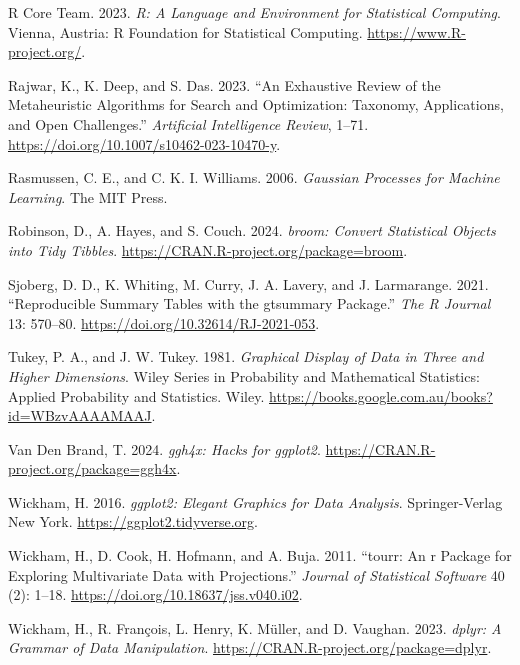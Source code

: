 \documentclass[
  12pt,
]{interact}
\newlength{\cslhangindent}
\newenvironment{CSLReferences}[2] %
 {\begin{list}{}{%
  \setlength{\itemindent}{0pt}
  \setlength{\leftmargin}{0pt}
  \setlength{\parsep}{0pt}
  \ifodd #1
   \setlength{\leftmargin}{\cslhangindent}
   \setlength{\itemindent}{-1\cslhangindent}
  \fi
  \setlength{\itemsep}{#2\baselineskip}}}
 {\end{list}}
\theoremstyle{plain}
\begin{document}
\begin{CSLReferences}{1}{0}
R Core Team. 2023. \emph{R: A Language and Environment for Statistical
Computing}. Vienna, Austria: R Foundation for Statistical Computing.
\url{https://www.R-project.org/}.

Rajwar, K., K. Deep, and S. Das. 2023. {``An Exhaustive Review of the
Metaheuristic Algorithms for Search and Optimization: Taxonomy,
Applications, and Open Challenges.''} \emph{Artificial Intelligence
Review}, 1--71. \url{https://doi.org/10.1007/s10462-023-10470-y}.

Rasmussen, C. E., and C. K. I. Williams. 2006. \emph{Gaussian Processes
for Machine Learning}. The MIT Press.

Robinson, D., A. Hayes, and S. Couch. 2024. \emph{{b}room: Convert
Statistical Objects into Tidy Tibbles}.
\url{https://CRAN.R-project.org/package=broom}.

Sjoberg, D. D., K. Whiting, M. Curry, J. A. Lavery, and J. Larmarange.
2021. {``Reproducible Summary Tables with the {g}tsummary Package.''}
\emph{{The R Journal}} 13: 570--80.
\url{https://doi.org/10.32614/RJ-2021-053}.

Tukey, P. A., and J. W. Tukey. 1981. \emph{Graphical Display of Data in
Three and Higher Dimensions}. Wiley Series in Probability and
Mathematical Statistics: Applied Probability and Statistics. Wiley.
\url{https://books.google.com.au/books?id=WBzvAAAAMAAJ}.

Van Den Brand, T. 2024. \emph{{g}gh4x: Hacks for {ggplot2}}.
\url{https://CRAN.R-project.org/package=ggh4x}.

Wickham, H. 2016. \emph{{g}gplot2: Elegant Graphics for Data Analysis}.
Springer-Verlag New York. \url{https://ggplot2.tidyverse.org}.

Wickham, H., D. Cook, H. Hofmann, and A. Buja. 2011. {``{t}ourr: An r
Package for Exploring Multivariate Data with Projections.''}
\emph{Journal of Statistical Software} 40 (2): 1--18.
\url{https://doi.org/10.18637/jss.v040.i02}.

Wickham, H., R. François, L. Henry, K. Müller, and D. Vaughan. 2023.
\emph{{d}plyr: A Grammar of Data Manipulation}.
\url{https://CRAN.R-project.org/package=dplyr}.


\end{CSLReferences}
\end{document}
